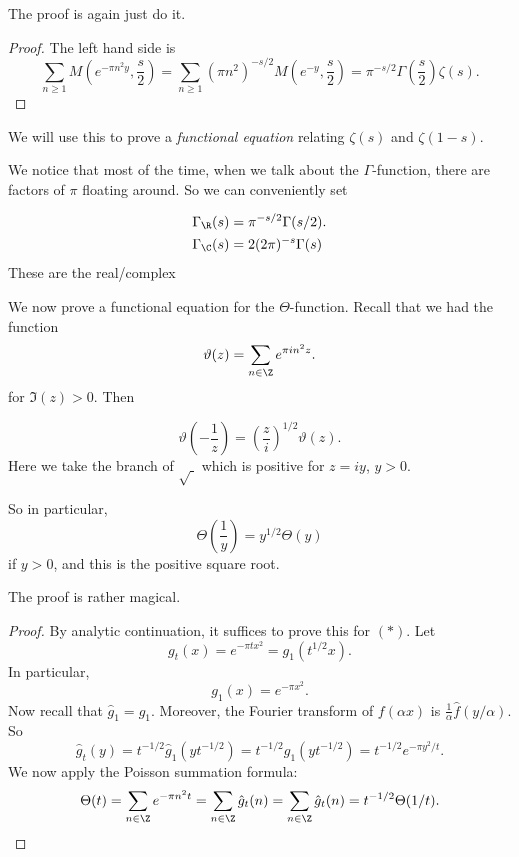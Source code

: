 \documentclass[a4paper]{article}
\begin{document}
The proof is again just do it.
\begin{proof}
  The left hand side is
  \[
    \sum_{n \geq 1} M\left(e^{-\pi n^2 y}, \frac{s}{2}\right) = \sum_{n \geq 1} (\pi n^2) ^{-s/2} M\left(e^{-y}, \frac{s}{2}\right) = \pi^{-s/2} \Gamma\left(\frac{s}{2}\right) \zeta(s).
  \]
\end{proof}
We will use this to prove a \emph{functional equation} relating $\zeta(s)$ and $\zeta(1 - s)$.

We notice that most of the time, when we talk about the $\Gamma$-function, there are factors of $\pi$ floating around. So we can conveniently set
\begin{notation}
  \begin{align*}
    \Gamma_\R(s) &= \pi^{-s/2} \Gamma(s/2).\\
    \Gamma_\C(s) &= 2 (2\pi)^{-s} \Gamma(s)
  \end{align*}
  These are the real/complex 
\end{notation}

We now prove a functional equation for the $\Theta$-function. Recall that we had the function
\[
  \vartheta(z) = \sum_{n \in \Z} e^{\pi i n^2 z}.
\]
for $\Im(z) > 0$. Then
\begin{thm}
  \[
    \vartheta \left(-\frac{1}{z}\right) = \left(\frac{z}{i}\right)^{1/2} \vartheta(z).
  \]
  Here we take the branch of $\sqrt{\;}$ which is positive for $z = iy$, $y > 0$.

  So in particular,
  \[
    \Theta\left(\frac{1}{y}\right) = y^{1/2} \Theta(y)\tag{$*$}
  \]
  if $y > 0$, and this is the positive square root.
\end{thm}

The proof is rather magical.
\begin{proof}
  By analytic continuation, it suffices to prove this for $(*)$. Let
  \[
    g_t(x) = e^{-\pi t x^2} = g_1(t^{1/2} x).
  \]
  In particular,
  \[
    g_1(x) = e^{-\pi x^2}.
  \]
  Now recall that $\hat{g}_1 = g_1$. Moreover, the Fourier transform of $f(\alpha x)$ is $\frac{1}{\alpha} \hat{f}(y/\alpha)$. So
  \[
    \hat{g}_t(y) = t^{-1/2} \hat{g}_1(y t^{-1/2})  = t^{-1/2} g_1(y t^{-1/2}) = t^{-1/2} e^{-\pi y^2/t}.
  \]
  We now apply the Poisson summation formula:
  \[
    \Theta(t) = \sum_{n \in \Z} e^{-\pi n^2 t} = \sum_{n \in \Z} \hat{g}_t(n) = \sum_{n \in \Z} \hat{g}_t(n) = t^{-1/2} \Theta(1/t).
  \]
\end{proof}
\end{document}
